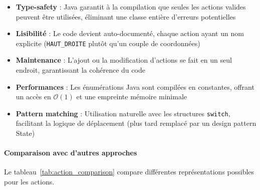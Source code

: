 \documentclass[10pt]{article} %
\begin{document}
\begin{itemize}
    \item \textbf{Type-safety} : Java garantit à la compilation que seules les actions valides peuvent être utilisées, éliminant une classe entière d'erreurs potentielles
    
    \item \textbf{Lisibilité} : Le code devient auto-documenté, chaque action ayant un nom explicite (\texttt{HAUT\_DROITE} plutôt qu'un couple de coordonnées)
    
    \item \textbf{Maintenance} : L'ajout ou la modification d'actions se fait en un seul endroit, garantissant la cohérence du code
    
    \item \textbf{Performances} : Les énumérations Java sont compilées en constantes, offrant un accès en $\mathcal{O}(1)$ et une empreinte mémoire minimale
    
    \item \textbf{Pattern matching} : Utilisation naturelle avec les structures \texttt{switch}, facilitant la logique de déplacement (plus tard remplacé par un design pattern State)
\end{itemize}

\paragraph{Comparaison avec d'autres approches}

Le tableau~\ref{tab:action_comparison} compare différentes représentations possibles pour les actions.
\end{document}
